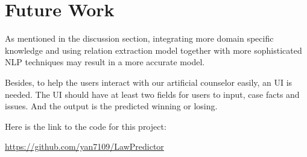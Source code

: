 \documentclass[journal]{IEEEtran}
\begin{document}
\section{Future Work}

As mentioned in the discussion section, integrating more domain specific knowledge and using relation extraction model together with more sophisticated NLP techniques may result in a more accurate model. 

Besides, to help the users interact with our artificial counselor easily, an UI is needed. The UI should have at least two fields for users to input, case facts and issues. And the output is the predicted winning or losing.

Here is the link to the code for this project:

\url{https://github.com/yan7109/LawPredictor}




\end{document}
